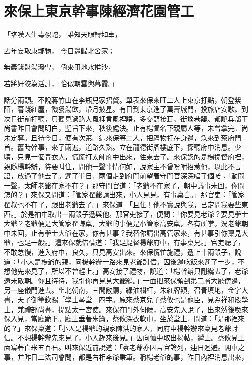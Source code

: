 %

\chapter{來保上東京幹事\KG 陳經濟花園管工}

「堪嘆人生毒似蛇，  誰知天眼轉如車，

去年妄取東鄰物，  今日還歸北舍家；

無義錢財湯潑雪，  倘來田地水推沙，

若將奸狡為活計，  恰似朝雲與暮霞。」

話分兩頭。不說蔣竹山在李瓶兒家招贅。單表來保來旺二人上東京打點，朝登紫陌，暮踐紅塵，饑餐湯飲，帶月披星。有日到東京進了萬壽城門，投旅店安歇。到次日街前打聽，只聽見過路人風裡言風裡語，多交頭接耳，街談巷議。都說兵部王尚書昨日會問明白，聖旨下來，秋後處決。止有楊督名下親屬人等，未曾拿完，尚未定奪。且待今日，便有次第。這來保等二人，把禮物打在身邊，急來到蔡府門首。舊時幹事，來了兩遍，道路久熟。立在龍德街牌樓底下，探聽府中消息。少頃，只見一個青衣人，慌慌打太師府中出來，往東去了。來保認的是楊提督府裡，親隨楊幹辦，待要叫住，問他一聲事情何如，說家主不曾吩咐招惹他，以此不言語，放過了他去了。遲了半日，兩個走到府門前望著守門官深深唱了個喏：「動問一聲，太師老爺在家不在？」那守門官道：「老爺不在家了，朝中議事未回，你問怎的？」來保又問道：「管家翟爺請出來，小人見見，有事稟白。」那官吏：「管家翟叔也不在了，跟出老爺去了。」來保道：「且住！他不實說與我，已定問我要些東西。」於是袖中取出一兩銀子遞與他。那官吏接了，便問：「你要見老爺？要見學士大爺？老爺便是大管家翟謙稟，大爺的事便是小管家高安稟，各有所掌。況老爺朝中未回，止有學士大爺在家，你有甚事？我替你請出高管家來，有甚事引你稟見大爺，也是一般。」這來保就借情道：「我是提督楊爺府中，有事稟見。」官吏聽了，不敢怠慢，進入府中，良久，只見高安出來。來保慌忙施禮，遞上十兩銀子，說道：「小人是楊爺的親，同楊幹辦一路來見老爺討信。因後邊吃飯來遲了一步，不想他先來見了，所以不曾趕上。」高安接了禮物，說道：「楊幹辦只剛纔去了，老爺還未散朝。你且待待，我引你再見見大爺罷。」一面把來保領到第二層大廳傍邊，另一座儀門進去。坐北朝南，三間敞廳，綠油欄杆，朱紅牌額，召青填地，金字大書，天子御筆欽賜「學士琴堂」四字。原來蔡京兒子蔡攸也是寵臣，見為祥和殿學士，兼禮部尚書，提點太一宮使。來保在門外伺候，高安先入說了，出來然後喚來保入見，當廳跪下。廳上垂著朱簾，蔡攸深衣軟巾，坐於堂上，問道：「是那裡來的？」來保稟道：「小人是楊爺的親家陳洪的家人，同府中楊幹辦來稟見老爺討信。不想楊幹辦先來見了，小人趕來後見。」因向懷中取出揭帖，遞上。蔡攸見上面寫著白米五百石。叫來保近前說道：「蔡老爺亦因言官論列，連日迴避。閣中之事，并昨日二法司會問，都是右相李爺秉筆。稱楊老爺的事，昨日內裡消息出來， 